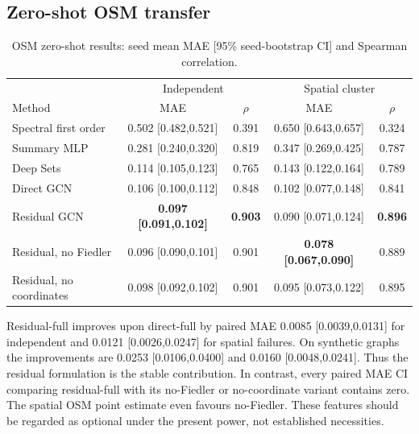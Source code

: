 \documentclass[11pt]{amsart}
\begin{document}
\subsection{Zero-shot OSM transfer}
\begin{table}[H]
\centering
\caption{OSM zero-shot results: seed mean MAE [95\% seed-bootstrap CI] and
Spearman correlation.}
\label{tab:main}
\small
\begin{tabular}{lcc|cc}
\toprule &\multicolumn{2}{c|}{Independent}&\multicolumn{2}{c}{Spatial cluster}\\
Method&MAE&$\rho$&MAE&$\rho$\\ \midrule
Spectral first order&0.502 [0.482,0.521]&0.391&0.650 [0.643,0.657]&0.324\\
Summary MLP&0.281 [0.240,0.320]&0.819&0.347 [0.269,0.425]&0.787\\
Deep Sets&0.114 [0.105,0.123]&0.765&0.143 [0.122,0.164]&0.789\\
Direct GCN&0.106 [0.100,0.112]&0.848&0.102 [0.077,0.148]&0.841\\
Residual GCN&\textbf{0.097 [0.091,0.102]}&\textbf{0.903}&0.090 [0.071,0.124]&\textbf{0.896}\\
Residual, no Fiedler&0.096 [0.090,0.101]&0.901&\textbf{0.078 [0.067,0.090]}&0.889\\
Residual, no coordinates&0.098 [0.092,0.102]&0.901&0.095 [0.073,0.122]&0.895\\
\bottomrule
\end{tabular}
\end{table}

Residual-full improves upon direct-full by paired MAE 0.0085
[0.0039,0.0131] for independent and 0.0121 [0.0026,0.0247] for spatial
failures. On synthetic graphs the improvements are 0.0253
[0.0106,0.0400] and 0.0160 [0.0048,0.0241]. Thus the residual formulation is
the stable contribution. In contrast, every paired MAE CI comparing
residual-full with its no-Fiedler or no-coordinate variant contains zero. The
spatial OSM point estimate even favours no-Fiedler. These features should be
regarded as optional under the present power, not established necessities.
\end{document}
